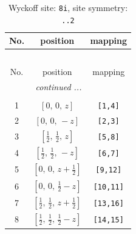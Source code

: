 \documentclass[fleqn,8pt]{jsarticle}
\begin{document}
\begin{longtable}{ccc}
\caption{Wyckoff site: {\tt 8i}, site symmetry: {\tt ..2}}
 \\
 \hline \hline
No. & position & mapping \\ \hline \endfirsthead

\multicolumn{2}{l}{\tablename\ \thetable{}} \\
 \hline \hline
No. & position & mapping \\ \hline \endhead

 \hline \hline
\multicolumn{2}{r}{\footnotesize\it continued ...} \\ \endfoot

 \hline \hline
\multicolumn{2}{r}{} \\ \endlastfoot

1 & $\left[ 0,\, 0,\, z \right]$ & {\tt [1,4]} \\ \hline
2 & $\left[ 0,\, 0,\, - z \right]$ & {\tt [2,3]} \\ \hline
3 & $\left[ \frac{1}{2},\, \frac{1}{2},\, z \right]$ & {\tt [5,8]} \\ \hline
4 & $\left[ \frac{1}{2},\, \frac{1}{2},\, - z \right]$ & {\tt [6,7]} \\ \hline
5 & $\left[ 0,\, 0,\, z + \frac{1}{2} \right]$ & {\tt [9,12]} \\ \hline
6 & $\left[ 0,\, 0,\, \frac{1}{2} - z \right]$ & {\tt [10,11]} \\ \hline
7 & $\left[ \frac{1}{2},\, \frac{1}{2},\, z + \frac{1}{2} \right]$ & {\tt [13,16]} \\ \hline
8 & $\left[ \frac{1}{2},\, \frac{1}{2},\, \frac{1}{2} - z \right]$ & {\tt [14,15]} \\
\end{longtable}
\renewcommand{\arraystretch}{1.2}
\end{document}

